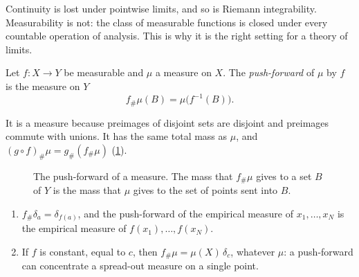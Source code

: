 \begin{notechapter}
\begin{keyidea}
Continuity is lost under pointwise limits, and so is Riemann
integrability. Measurability is not: the class of measurable functions
is closed under every countable operation of analysis. This is why it is
the right setting for a theory of limits.
\end{keyidea}

\begin{definition}\label{measures:def:pushforward}
Let $f:X\to Y$ be measurable and $\mu$ a measure on $X$. The
\emph{push-forward} of $\mu$ by $f$ is the measure on $Y$
\[
  f_\#\mu(B) = \mu\bigl(f^{-1}(B)\bigr) .
\]
\end{definition}

It is a measure because preimages of disjoint sets are disjoint and
preimages commute with unions. It has the same total mass as $\mu$, and
$(g\circ f)_\#\mu = g_\#(f_\#\mu)$
(\cref{measures:fig:pushforward}).

\begin{figure}[ht]
\centering
{}
\caption{The push-forward of a measure. The mass that $f_\#\mu$ gives to
a set $B$ of $Y$ is the mass that $\mu$ gives to the set of points sent
into $B$.}
\label{measures:fig:pushforward}
\end{figure}

\begin{example}\label{measures:ex:pushforward}
\begin{enumerate}[nosep]
  \item $f_\#\delta_a = \delta_{f(a)}$, and the push-forward of the
        empirical measure of $x_1,\dots,x_N$ is the empirical measure of
        $f(x_1),\dots,f(x_N)$.
  \item If $f$ is constant, equal to $c$, then
        $f_\#\mu = \mu(X)\,\delta_c$, whatever $\mu$: a push-forward can
        concentrate a spread-out measure on a single point.
\end{enumerate}
\end{example}


\end{notechapter}
